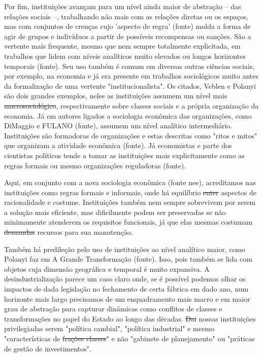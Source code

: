 Por fim, instituições avançam para um nível ainda maior de abstração -- das relações sociais --,
trabalhando não mais com as relações diretas ou os espaços, mas com
conjuntos de crenças cujo 'aspecto de regra' (fonte) molda a forma
de agir de grupos e indivíduos a partir de possíveis recompensas ou sanções. São a vertente mais frequente, mesmo que nem sempre totalmente explicitada, em trabalhos que lidem com 
níveis analíticos muito elevados ou longos horizontes temporais (fonte). Seu uso também é comum em diversas outras ciências sociais,
por exemplo, na economia e já era presente em trabalhos sociológicos
muito antes da formalização de uma vertente "institucionalista". Os
citados, Veblen e Polanyi são dois grandes exemplos, neles as instituições assumem um nível mais \sout{macrosociológico}, respectivamente sobre classes sociais e a própria organização da economia. Já em autores ligados a sociologia econômica das organizações, como DiMaggio e FULANO (fonte), assumem um nível analítico intermediário. Instituições são formadoras de organizações e estas descritas como "ritos e mitos" que organizam a atividade econômica (fonte). Já economistas e parte dos cientistas políticos
tende a tomar as instituições mais explicitamente como as regras formais ou mesmo organizações reguladoras (fonte).

Aqui, em conjunto com a nova sociologia econômica (fonte nee), acreditamos nas instituições como regras formais e informais, onde há equilíbrio \sout{enter} aspectos de racionalidade e costume. Instituições também nem sempre sobrevivem por serem a solução mais eficiente, mas dificilmente podem ser preservadas se não minimamente atenderem os requisitos funcionais, já que elas mesmas costumam \sout{demandas} recursos
para sua manutenção.

Também há predileção pelo uso de instituições ao nível analítico maior, como Polanyi faz em A Grande Transformação (fonte). Isso, pois também se lida com objetos cuja dimensão
geográfica e temporal é muito expansiva. A desindustrialização parece um caso claro onde, se é possível podemos olhar os impactos de dada legislação no fechamento de certa fábrica em dado ano, num horizonte mais largo precisamos de um enquadramento mais macro e em maior grau de abstração para capturar dinâmicas como conflitos
de classes e transformações no papel do Estado ao longo das décadas. \sout{Dai} nossas instituições privilegiadas serem "política cambial", "política industrial" e mesmo "características de \sout{frações classes}" e não "gabinete de planejamento" ou "práticas de gestão de investimentos".

